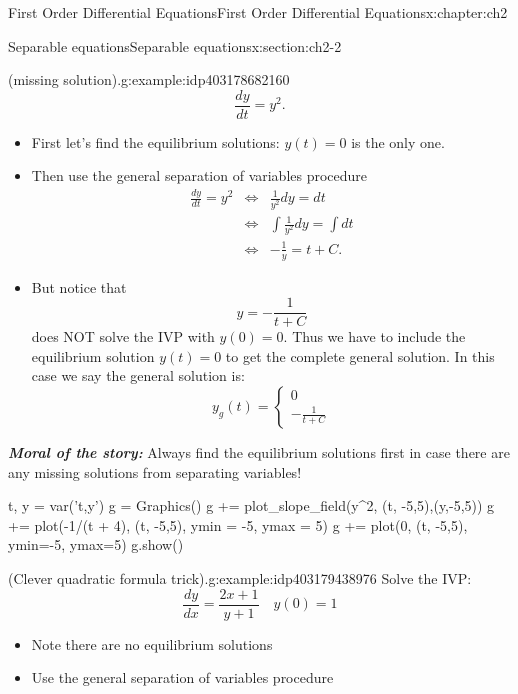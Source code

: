 \documentclass[oneside,10pt,]{book}
\newcommand{\alert}[1]{\textbf{\textit{#1}}}
\numberwithin{equation}{section}
\numberwithin{equation}{section}
\newcommand{\amp}{&}
\begin{document}
\begin{chapterptx}{First Order Differential Equations}{}{First Order Differential Equations}{}{}{x:chapter:ch2}
\begin{sectionptx}{Separable equations}{}{Separable equations}{}{}{x:section:ch2-2}
\begin{example}{(missing solution).}{g:example:idp403178682160}
\begin{equation*}
\frac{dy}{dt}=y^{2}.
\end{equation*}
%
%
\begin{itemize}[label=\textbullet]
\item{}First let's find the equilibrium solutions: \(y(t)=0\) is the only one.%
\item{}Then use the general separation of variables procedure%
\begin{align*}
\frac{dy}{dt}=y^{2} \amp \iff \amp \frac{1}{y^{2}}dy=dt\\
\amp \iff \amp \int\frac{1}{y^{2}}dy=\int dt\\
\amp \iff \amp -\frac{1}{y}=t+C.
\end{align*}
%
\item{}But notice that%
\begin{equation*}
y=-\frac{1}{t+C}
\end{equation*}
does NOT solve the IVP with \(y(0)=0\). Thus we have to include the equilibrium solution \(y(t)=0\) to get the complete general solution. In this case we say the general solution is:%
\begin{equation*}
y_g(t) = \begin{cases}
0\\
-\frac{1}{t + C}
\end{cases}
\end{equation*}
%
\end{itemize}
\alert{Moral of the story:} Always find the equilibrium solutions first in case there are any missing solutions from separating variables!%
\begin{sageinput}
t, y = var('t,y')
g = Graphics()
g += plot_slope_field(y^2, (t, -5,5),(y,-5,5))
g += plot(-1/(t + 4), (t, -5,5), ymin = -5, ymax = 5)
g += plot(0, (t, -5,5), ymin=-5, ymax=5)
g.show()
\end{sageinput}
\end{example}
\begin{example}{(Clever quadratic formula trick).}{g:example:idp403179438976}%
Solve the IVP:%
\begin{equation*}
\frac{dy}{dx}=\frac{2x+1}{y+1}\,\,\,\,\,\,y(0)=1
\end{equation*}
%
%
\begin{itemize}[label=\textbullet]
\item{}Note there are no equilibrium solutions%
\item{}Use the general separation of variables procedure%
\begin{align*}

\end{align*}
\end{itemize}
\end{example}
\end{sectionptx}
\end{chapterptx}
\end{document}
